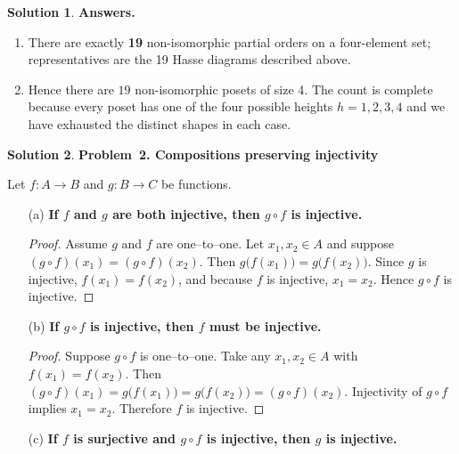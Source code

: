 \documentclass[12pt]{article}
\theoremstyle{definition} %
\newtheorem{solution}{Solution}
\theoremstyle{plain} %
\begin{document}
\begin{solution}
\textbf{Answers.}

\begin{enumerate}[label=\textbf{(\alph*)}]
\item There are exactly \textbf{19} non-isomorphic partial orders on a
      four-element set; representatives are the 19 Hasse diagrams
      described above.

\item Hence there are \(\boxed{19}\) non-isomorphic posets of size 4.
      The count is complete because every poset has one of the four
      possible heights \(h=1,2,3,4\) and we have exhausted the distinct
      shapes in each case.
\end{enumerate}
\end{solution}
\begin{solution}
  \textbf{Problem 2.  Compositions preserving injectivity}
  
  Let \(f:A\to B\) and \(g:B\to C\) be functions.
  
  \begin{enumerate}
      \item[(a)] \textbf{If \(f\) and \(g\) are both injective, then \(g\circ f\) is injective.}
  
            \begin{proof}
                Assume \(g\) and \(f\) are one–to–one.  
                Let \(x_1,x_2\in A\) and suppose \((g\circ f)(x_1)=(g\circ f)(x_2)\).
                Then \(g\!\bigl(f(x_1)\bigr)=g\!\bigl(f(x_2)\bigr)\).
                Since \(g\) is injective, \(f(x_1)=f(x_2)\),
                and because \(f\) is injective, \(x_1=x_2\).
                Hence \(g\circ f\) is injective.
            \end{proof}
  
      \item[(b)] \textbf{If \(g\circ f\) is injective, then \(f\) must be injective.}
  
            \begin{proof}
                Suppose \(g\circ f\) is one–to–one.
                Take any \(x_1,x_2\in A\) with \(f(x_1)=f(x_2)\).
                Then \((g\circ f)(x_1)=g\!\bigl(f(x_1)\bigr)=
                g\!\bigl(f(x_2)\bigr)=(g\circ f)(x_2)\).
                Injectivity of \(g\circ f\) implies \(x_1=x_2\).
                Therefore \(f\) is injective.
            \end{proof}
  
      \item[(c)] \textbf{If \(f\) is surjective and \(g\circ f\) is injective, then \(g\) is injective.}
  

\end{enumerate}
\end{solution}
\end{document}
